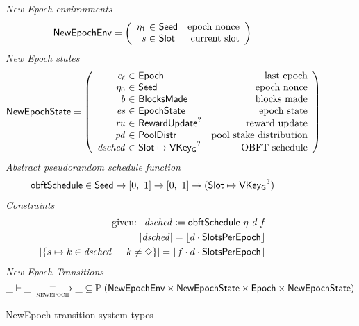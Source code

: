 \begin{figure}
  \emph{New Epoch environments}
  \begin{equation*}
    \NewEpochEnv =
    \left(
      \begin{array}{r@{~\in~}lr}
        \eta_1 & \Seed & \text{epoch nonce} \\
        \var{s} & \Slot & \text{current slot}
      \end{array}
    \right)
  \end{equation*}
  \emph{New Epoch states}
  \begin{equation*}
    \NewEpochState =
    \left(
      \begin{array}{r@{~\in~}lr}
        \var{e_\ell} & \Epoch & \text{last epoch} \\
        \eta_0 & \Seed & \text{epoch nonce} \\
        \var{b} & \BlocksMade & \text{blocks made} \\
        \var{es} & \EpochState & \text{epoch state} \\
        \var{ru} & \RewardUpdate^? & \text{reward update} \\
        \var{pd} & \PoolDistr & \text{pool stake distribution} \\
        \var{dsched} & \Slot\mapsto\VKeyGen^? & \text{OBFT schedule} \\
      \end{array}
    \right)
  \end{equation*}
  \emph{Abstract pseudorandom schedule function}
  \begin{align*}
    & \mathsf{obftSchedule} \in \mathsf{Seed} \to [0,~1] \to [0,~1] \to
      (\mathsf{Slot}\mapsto\mathsf{VKey_G}^?) \\
  \end{align*}
  \emph{Constraints}
  \begin{align*}
    \text{ given: }~\mathit{dsched}\mathrel{\mathop:}=\mathsf{obftSchedule}~\eta~\mathit{d}~\mathit{f} \\
    |\mathit{dsched}| = \lfloor d\cdot\mathsf{SlotsPerEpoch}\rfloor \\
    |\{s\mapsto k\in\mathit{dsched}~\mid~k\neq\Diamond\}| = \lfloor f\cdot d\cdot\mathsf{SlotsPerEpoch}\rfloor \\
  \end{align*}
  \emph{New Epoch Transitions}
  \begin{equation*}
    \_ \vdash \var{\_} \trans{newepoch}{\_} \var{\_} \subseteq
    \powerset (\NewEpochEnv \times \NewEpochState \times \Epoch \times \NewEpochState)
  \end{equation*}
  \caption{NewEpoch transition-system types}
  \label{fig:ts-types:newepoch}
\end{figure}

